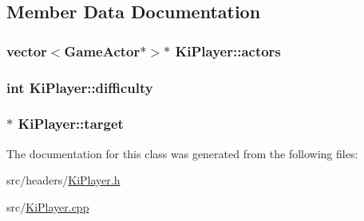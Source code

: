 \subsection{Member Data Documentation}
\hypertarget{class_ki_player_a0da596a3550eaccd42d70c915b588303}{
\subsubsection[{actors}]{\setlength{\rightskip}{0pt plus 5cm}vector$<${\bf Game\+Actor}$\ast$$>$$\ast$ Ki\+Player\+::actors\hspace{0.3cm}{\ttfamily [protected]}}}\label{class_ki_player_a0da596a3550eaccd42d70c915b588303}
\hypertarget{class_ki_player_af7ba0444a46f7d46b6af4b31a2808c2a}{
\subsubsection[{difficulty}]{\setlength{\rightskip}{0pt plus 5cm}int Ki\+Player\+::difficulty\hspace{0.3cm}{\ttfamily [protected]}}}\label{class_ki_player_af7ba0444a46f7d46b6af4b31a2808c2a}
\hypertarget{class_ki_player_ade46a263a1242d7fa6e20d72008437ab}{
\subsubsection[{target}]{$\ast$ Ki\+Player\+::target\hspace{0.3cm}{\ttfamily [protected]}}}\label{class_ki_player_ade46a263a1242d7fa6e20d72008437ab}


The documentation for this class was generated from the following files\+:\begin{DoxyCompactItemize}
\item 
src/headers/\hyperlink{_ki_player_8h}{Ki\+Player.\+h}\item 
src/\hyperlink{_ki_player_8cpp}{Ki\+Player.\+cpp}\end{DoxyCompactItemize}
